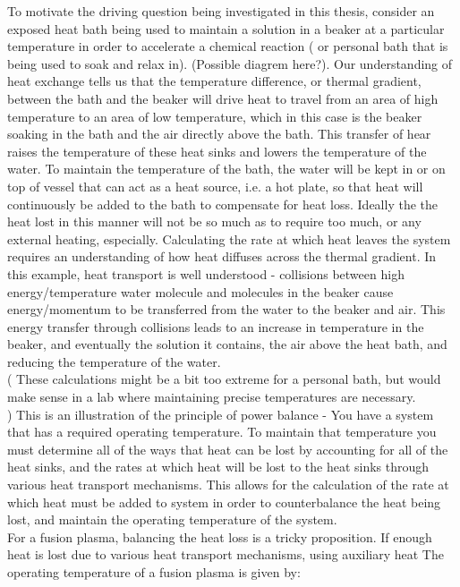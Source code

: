 \documentclass{article}
\begin{document}
To motivate the driving question being investigated in this thesis, consider an exposed heat bath being used to maintain a solution in a beaker at a particular temperature in order to accelerate a chemical reaction ( or personal bath that is being used to soak and relax in). (Possible diagrem here?). Our understanding of heat exchange tells us that the temperature difference, or thermal gradient, between the bath and the beaker will drive heat to travel from an area of high temperature to an area of low temperature, which in this case is the beaker soaking in the bath and the air directly above the bath. This transfer of hear raises the temperature of these heat sinks and lowers the temperature of the water. To maintain the temperature of the bath, the water will be kept in or on top of vessel that can act as a heat source, i.e. a hot plate, so that heat will continuously be added to the bath to compensate for heat loss. Ideally the the heat lost in this manner will not be so much as to require too much, or any external heating, especially. Calculating the rate at which heat leaves the system requires an understanding of how  heat diffuses across the thermal gradient. In this example, heat transport is well understood - collisions between high energy/temperature water molecule and molecules in the beaker cause energy/momentum to be transferred from the water to the beaker and air. This energy transfer through collisions leads to an increase in temperature in the beaker, and eventually the solution it contains, the air above the heat bath, and reducing the temperature of the water.\\
( These calculations might be a bit too extreme for a personal bath, but would make sense in a lab where maintaining precise temperatures are necessary.\\)
 This is an illustration of the principle of power balance - You have a system that has a required operating temperature. To maintain that temperature you must determine all of the ways that heat can be lost by accounting for all of the heat sinks, and the rates at which heat will be lost to the heat sinks through various heat transport mechanisms. This allows for the calculation of the rate at which heat must be added to system in order to counterbalance the heat being lost, and maintain the operating temperature of the system.\\
For a fusion plasma, balancing the heat loss is a tricky proposition. If enough heat is lost due to various heat transport mechanisms, using auxiliary heat
The operating temperature of a fusion plasma is given by:
\end{document}
